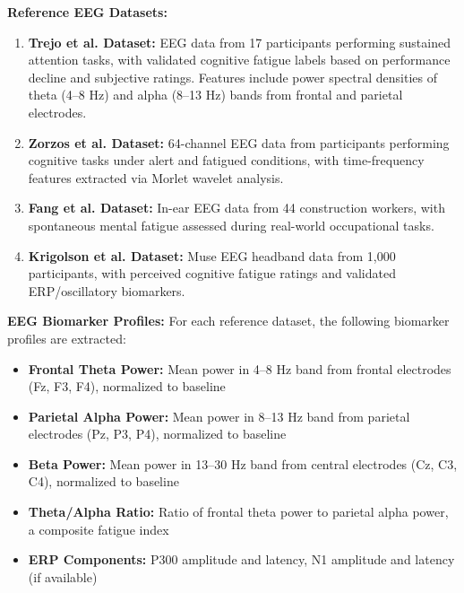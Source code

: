 \documentclass[journal,twoside,10pt]{IEEEtran}
\begin{document}
\textbf{Reference EEG Datasets:}
\begin{enumerate}
\item \textbf{Trejo et al. \cite{ref1,ref4} Dataset:} EEG data from 17 participants performing sustained attention tasks, with validated cognitive fatigue labels based on performance decline and subjective ratings. Features include power spectral densities of theta (4--8 Hz) and alpha (8--13 Hz) bands from frontal and parietal electrodes.
\item \textbf{Zorzos et al. \cite{ref10} Dataset:} 64-channel EEG data from participants performing cognitive tasks under alert and fatigued conditions, with time-frequency features extracted via Morlet wavelet analysis.
\item \textbf{Fang et al. \cite{ref25} Dataset:} In-ear EEG data from 44 construction workers, with spontaneous mental fatigue assessed during real-world occupational tasks.
\item \textbf{Krigolson et al. \cite{ref23} Dataset:} Muse EEG headband data from 1,000 participants, with perceived cognitive fatigue ratings and validated ERP/oscillatory biomarkers.
\end{enumerate}

\textbf{EEG Biomarker Profiles:}
For each reference dataset, the following biomarker profiles are extracted:
\begin{itemize}
\item \textbf{Frontal Theta Power:} Mean power in 4--8 Hz band from frontal electrodes (Fz, F3, F4), normalized to baseline
\item \textbf{Parietal Alpha Power:} Mean power in 8--13 Hz band from parietal electrodes (Pz, P3, P4), normalized to baseline
\item \textbf{Beta Power:} Mean power in 13--30 Hz band from central electrodes (Cz, C3, C4), normalized to baseline
\item \textbf{Theta/Alpha Ratio:} Ratio of frontal theta power to parietal alpha power, a composite fatigue index
\item \textbf{ERP Components:} P300 amplitude and latency, N1 amplitude and latency (if available)
\end{itemize}
\end{document}
